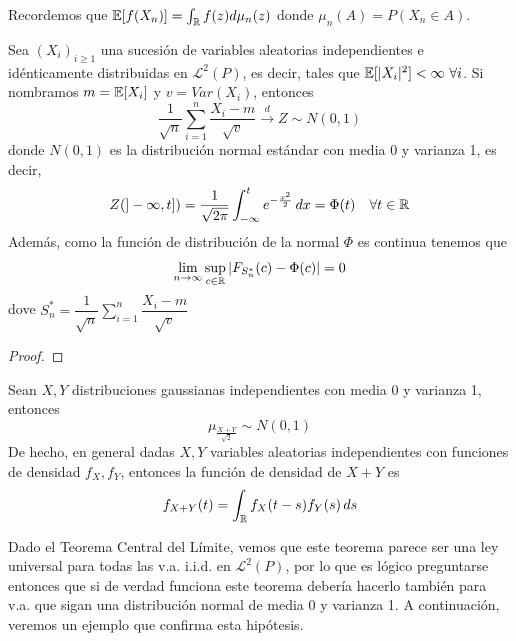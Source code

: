 \begin{observacion}
    Recordemos que $\mathbb{E}[f(X_n)]= \int_{\mathbb{R}}f(z)d\mu_n(z)$ donde $\mu_n(A)=P(X_n\in A)$.
\end{observacion}

\begin{teo}
    Sea $(X_i)_{i\geq 1}$ una sucesión de variables aleatorias independientes e idénticamente distribuidas en $\mathcal{L}^2(P)$, es decir, tales que $\E[|X_i|^2] < \infty \ \forall i$. Si nombramos $m = \mathbb{E}[X_i]$ y $v = Var(X_i)$, entonces
    \begin{equation*}
        \dfrac{1}{\sqrt{n}}\sum\limits_{i=1}^n \dfrac{X_i - m}{\sqrt{v}} \xrightarrow{d} Z \sim N(0,1)
    \end{equation*}
    donde $N(0,1)$ es la distribución normal estándar con media 0 y varianza 1, es decir,
    \begin{equation*}
        Z(]-\infty, t]) = \dfrac{1}{\sqrt{2\pi}} \int_{-\infty}^t e^{-\frac{x^2}{2}} \, dx=\Phi(t) \quad \forall t \in \mathbb{R}
    \end{equation*}
    Además, como la función de distribución de la normal $\Phi$ es continua tenemos que 
    \begin{equation*}
        \lim_{n\to \infty} \sup_{c\in \mathbb{R}}|F_{S_n^*}(c)- \Phi(c)|=0
    \end{equation*}
    dove $S_n^* = \dfrac{1}{\sqrt{n}}\sum\limits_{i=1}^n\dfrac{ X_i - m}{\sqrt{v}}$
    \begin{proof}
    \end{proof}
\end{teo}

\begin{coro}
    Sean $X,Y$ distribuciones gaussianas independientes con media 0 y varianza 1, entonces
    \begin{equation*}
        \mu_{\frac{X+Y}{\sqrt{2}}} \sim N(0,1)
    \end{equation*}
    De hecho, en general dadas $X,Y$ variables aleatorias independientes con funciones de densidad $f_X, f_Y$, entonces la función de densidad de $X+Y$ es
    \begin{equation*}
        f_{X+Y}(t)=\int_{\mathbb{R}} f_X(t - s) f_Y(s) \, ds
    \end{equation*}
\end{coro}

\noindent 
Dado el Teorema Central del Límite, vemos que este teorema parece ser una ley universal para todas las v.a. i.i.d. en $\mathcal{L}^2(P)$, por lo que es lógico preguntarse entonces que si de verdad funciona este teorema debería hacerlo también para v.a. que sigan una distribución normal de media 0 y varianza 1. A continuación, veremos un ejemplo que confirma esta hipótesis.

